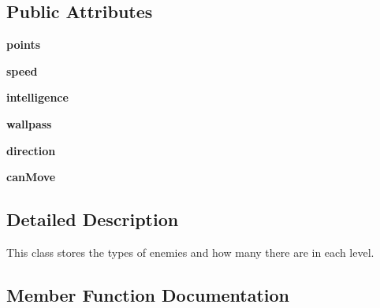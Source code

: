 \subsection*{Public Attributes}
\begin{DoxyCompactItemize}
\item 
\hypertarget{classsrc_1_1enemy_1_1_enemy_ae9fc7353b9fbbad3c2d0330169a14fe5}{}{\bfseries points}\label{classsrc_1_1enemy_1_1_enemy_ae9fc7353b9fbbad3c2d0330169a14fe5}

\item 
\hypertarget{classsrc_1_1enemy_1_1_enemy_a24e64f3d82db0537f8438780bb1b082d}{}{\bfseries speed}\label{classsrc_1_1enemy_1_1_enemy_a24e64f3d82db0537f8438780bb1b082d}

\item 
\hypertarget{classsrc_1_1enemy_1_1_enemy_a11c139459feab2281e0804adc1e0276d}{}{\bfseries intelligence}\label{classsrc_1_1enemy_1_1_enemy_a11c139459feab2281e0804adc1e0276d}

\item 
\hypertarget{classsrc_1_1enemy_1_1_enemy_a3efd2aacdc7f1eca427075919649c09e}{}{\bfseries wallpass}\label{classsrc_1_1enemy_1_1_enemy_a3efd2aacdc7f1eca427075919649c09e}

\item 
\hypertarget{classsrc_1_1enemy_1_1_enemy_ad232e0c586291fffbc676d6b20658cd2}{}{\bfseries direction}\label{classsrc_1_1enemy_1_1_enemy_ad232e0c586291fffbc676d6b20658cd2}

\item 
\hypertarget{classsrc_1_1enemy_1_1_enemy_aca96a4793e02437f1f33a1c3cbefd133}{}{\bfseries can\+Move}\label{classsrc_1_1enemy_1_1_enemy_aca96a4793e02437f1f33a1c3cbefd133}

\end{DoxyCompactItemize}


\subsection{Detailed Description}
This class stores the types of enemies and how many there are in each level. 



\subsection{Member Function Documentation}
\hypertarget{classsrc_1_1enemy_1_1_enemy_a4476f5bc0be70d26bebece6abcb7bdad}{}
